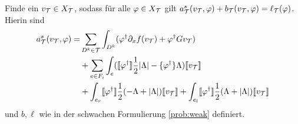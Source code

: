 \begin{problem}
  \label{prob:strong}
  Finde ein $v_{\mathcal{T}}\in X_{\mathcal{T}}$, sodass für alle $\varphi\in X_{\mathcal{T}}$ gilt $a_{\mathcal{T}}^s(v_{\mathcal{T}}, \varphi) + b_{\mathcal{T}}(v_{\mathcal{T}}, \varphi) = \ell_{\mathcal{T}}(\varphi)$. Hierin sind
  \begin{equation}
    \begin{aligned}
    a_{\mathcal{T}}^s(v_{\mathcal{T}}, \varphi) = &\sum_{D^k\in\mathcal{T}}\int_{D^k} (
    \varphi^{\dagger} \partial_x f(v_{\mathcal{T}}) + \varphi^{\dagger} G v_{\mathcal{T}}) \\
    &+ \sum_{e\in F_i}\int_{e}  (\llbracket \varphi^{\dagger} \rrbracket \frac{1}{2}|\Lambda| - \{ \varphi^{\dagger} \}\Lambda) \llbracket v_{\mathcal{T}} \rrbracket \\
    &+ \int_{e_r} \llbracket \varphi^{\dagger} \rrbracket \frac{1}{2}(-\Lambda + |\Lambda|)\llbracket v_{\mathcal{T}} \rrbracket
    + \int_{e_l} \llbracket \varphi^{\dagger} \rrbracket \frac{1}{2}(\Lambda + |\Lambda|)\llbracket v_{\mathcal{T}} \rrbracket
  \end{aligned}
  \label{eq:bilinear_strong}
  \end{equation}
  und $b,\ell$ wie in der schwachen Formulierung \ref{prob:weak} definiert.
\end{problem}

